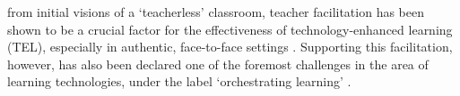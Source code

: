 \documentclass[10pt,journal,compsoc]{IEEEtran}
\begin{document}
%
\IEEEpeerreviewmaketitle





% 
% 
% 
% 


 from initial visions of a `teacherless' classroom, teacher facilitation has been shown to be a crucial factor for the effectiveness of technology-enhanced learning (TEL), especially in authentic, face-to-face settings \cite{Gomez2013,Onrubia2012}. Supporting this facilitation, however, has also been declared one of the foremost challenges in the area of learning technologies, under the label `orchestrating learning' \cite{STELLARorch}. 
\end{document}
